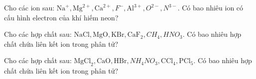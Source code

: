 \begin{bt}
	Cho các ion sau: $\mathrm{Na}^{+}, \mathrm{Mg}^{2+}, \mathrm{Ca}^{2+}, F^{-}, \mathrm{Al}^{3+}, O^{2-}, N^{3-}$. Có bao nhiêu ion có cấu hình electron của khí hiếm neon?
	\shortans{}
	\loigiai{}
\end{bt}

\begin{bt}
	Cho các hợp chất sau: $\mathrm{NaCl}, \mathrm{MgO}, \mathrm{KBr}, \mathrm{CaF}_2, CH_4, HNO_3$. Có bao nhiêu hợp chất chứa liên kết ion trong phân tử?
	\shortans{}
	\loigiai{}
\end{bt}

\begin{bt}
	Cho các hợp chất sau: $\mathrm{MgCl}_2, \mathrm{CaO}, \mathrm{HBr}, NH_4NO_3, \mathrm{CCl}_4, \mathrm{PCl}_5$. Có bao nhiêu hợp chất chứa liên kết ion trong phân tử?
	\shortans{}
	\loigiai{}
\end{bt}
